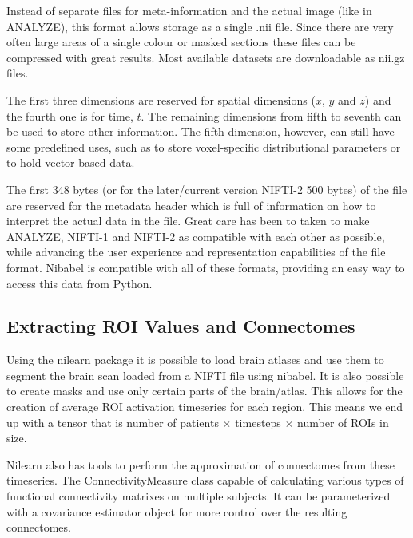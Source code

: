 	Instead of separate files for meta-information and the actual image (like in ANALYZE), this format allows storage as a single .nii file. Since there are very often large areas of a single colour or masked sections these files can be compressed with great results. Most available datasets are downloadable as nii.gz files.
	
	The first three dimensions are reserved for spatial dimensions ($x$, $y$ and $z$) and the fourth one is for time, $t$. The remaining dimensions from fifth to seventh can be used to store other information. The fifth dimension, however, can still have some predefined uses, such as to store voxel-specific distributional parameters or to hold vector-based data. 
	
	The first 348 bytes (or for the later/current version NIFTI-2 500 bytes) of the file are reserved for the metadata header which is full of information on how to interpret the actual data in the file. Great care has been to taken to make ANALYZE, NIFTI-1 and NIFTI-2 as compatible with each other as possible, while advancing the user experience and representation capabilities of the file format. Nibabel is compatible with all of these formats, providing an easy way to access this data from Python.
	
	
	\subsection{Extracting ROI Values and Connectomes}
	\label{sec:extract}
	
	Using the nilearn package it is possible to load brain atlases and use them to segment the brain scan loaded from a NIFTI file using nibabel. It is also possible to create masks and use only certain parts of the brain/atlas. This allows for the creation of average ROI activation timeseries for each region. This means we end up with a tensor that is number of patients $\times$ timesteps $\times$ number of ROIs in size.
	
	Nilearn also has tools to perform the approximation of connectomes from these timeseries. The ConnectivityMeasure class capable of calculating various types of functional connectivity matrixes on multiple subjects. It can be parameterized with a covariance estimator object for more control over the resulting connectomes.
	